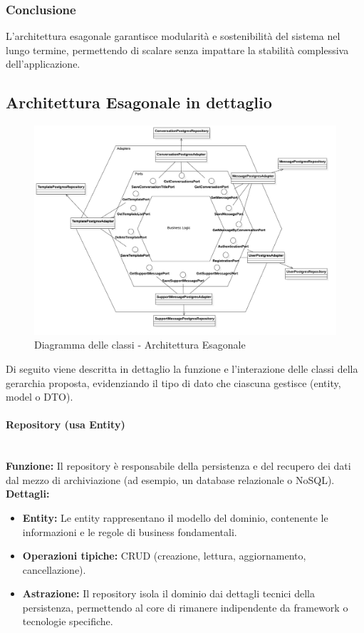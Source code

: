 \subsubsection{Conclusione}
L’architettura esagonale garantisce modularità e sostenibilità del sistema nel lungo termine, permettendo di scalare senza impattare la stabilità complessiva dell’applicazione.

\subsection{Architettura Esagonale in dettaglio}
\begin{figure}[H]
    \centering
    \includegraphics[width=\linewidth, height=0.8\textheight, keepaspectratio]{./img/ArchitetturaEsagonaleStarUML.png}
    \caption{Diagramma delle classi - Architettura Esagonale}
    \label{fig:architettura_esagonale}
\end{figure}
Di seguito viene descritta in dettaglio la funzione e l'interazione delle classi della gerarchia proposta, evidenziando il tipo di dato che ciascuna gestisce (entity, model o DTO).

\paragraph{Repository (usa Entity)} 
\mbox{}\\
\textbf{Funzione:} Il repository è responsabile della persistenza e del recupero dei dati dal mezzo di archiviazione (ad esempio, un database relazionale o NoSQL). 
\mbox{}\\
\textbf{Dettagli:}
\begin{itemize}
  \item \textbf{Entity:} Le entity rappresentano il modello del dominio, contenente le informazioni e le regole di business fondamentali.
  \item \textbf{Operazioni tipiche:} CRUD (creazione, lettura, aggiornamento, cancellazione).
  \item \textbf{Astrazione:} Il repository isola il dominio dai dettagli tecnici della persistenza, permettendo al core di rimanere indipendente da framework o tecnologie specifiche.
\end{itemize}

